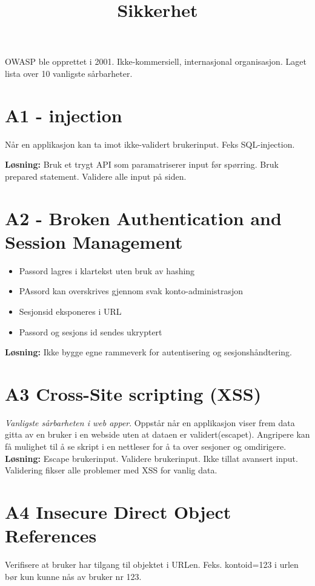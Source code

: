 \documentclass{article}
\title{Sikkerhet}
\begin{document}
    \begin{flushleft}

        OWASP ble opprettet i 2001. Ikke-kommersiell, internasjonal organisasjon. Laget lista over 10 vanligste sårbarheter.
        \section{A1 - injection }
        Når en applikasjon kan ta imot ikke-validert brukerinput. Feks SQL-injection.\par
        \textbf{Løsning:} Bruk et trygt API som paramatriserer input før spørring. Bruk prepared statement.
        Validere alle input på siden.

        \section{A2 - Broken Authentication and Session Management}
        \begin{itemize}
            \item Passord lagres i klartekst uten bruk av hashing
            \item PAssord kan overskrives gjennom svak konto-administrasjon
            \item Sesjonsid eksponeres i URL
            \item Passord og sesjons id sendes ukryptert
        \end{itemize}

        \textbf{Løsning:} Ikke bygge egne rammeverk for autentisering og sesjonshåndtering. 

        \section{A3 Cross-Site scripting (XSS)}
        \emph{Vanligste sårbarheten i web apper}. Oppstår når en applikasjon viser frem data gitta av en bruker i en webside uten at dataen er validert(escapet).
        Angripere kan få mulighet til å se skript  i en nettleser for å ta over sesjoner og omdirigere. 
        \textbf{Løsning:} Escape brukerinput. Validere brukerinput. Ikke tillat avansert input. Validering fikser alle problemer med XSS for vanlig data.

        \section{A4 Insecure Direct Object References}
        Verifisere at bruker har tilgang til objektet i URLen. Feks. kontoid=123 i urlen bør kun kunne nås av bruker nr 123.


\end{flushleft}
\end{document}
